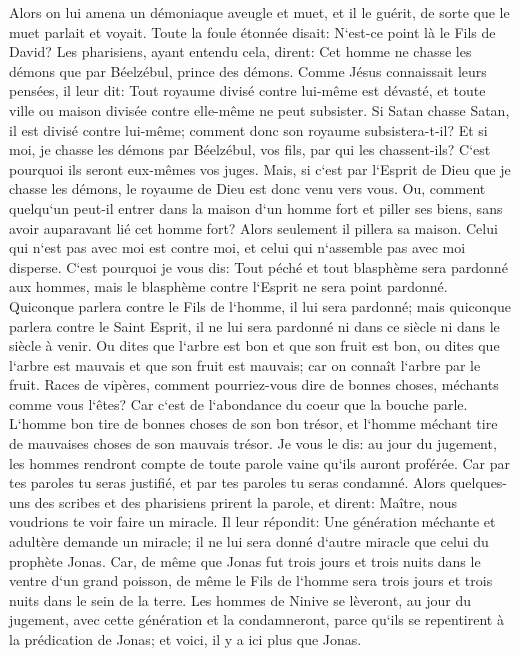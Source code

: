 \verse Alors on lui amena un démoniaque aveugle et muet, et il le guérit, de sorte que le muet parlait et voyait. 
\verse Toute la foule étonnée disait: N`est-ce point là le Fils de David? 
\verse Les pharisiens, ayant entendu cela, dirent: Cet homme ne chasse les démons que par Béelzébul, prince des démons. 
\verse Comme Jésus connaissait leurs pensées, il leur dit: Tout royaume divisé contre lui-même est dévasté, et toute ville ou maison divisée contre elle-même ne peut subsister. 
\verse Si Satan chasse Satan, il est divisé contre lui-même; comment donc son royaume subsistera-t-il? 
\verse Et si moi, je chasse les démons par Béelzébul, vos fils, par qui les chassent-ils? C`est pourquoi ils seront eux-mêmes vos juges. 
\verse Mais, si c`est par l`Esprit de Dieu que je chasse les démons, le royaume de Dieu est donc venu vers vous. 
\verse Ou, comment quelqu`un peut-il entrer dans la maison d`un homme fort et piller ses biens, sans avoir auparavant lié cet homme fort? Alors seulement il pillera sa maison. 
\verse Celui qui n`est pas avec moi est contre moi, et celui qui n`assemble pas avec moi disperse. 
\verse C`est pourquoi je vous dis: Tout péché et tout blasphème sera pardonné aux hommes, mais le blasphème contre l`Esprit ne sera point pardonné. 
\verse Quiconque parlera contre le Fils de l`homme, il lui sera pardonné; mais quiconque parlera contre le Saint Esprit, il ne lui sera pardonné ni dans ce siècle ni dans le siècle à venir. 
\verse Ou dites que l`arbre est bon et que son fruit est bon, ou dites que l`arbre est mauvais et que son fruit est mauvais; car on connaît l`arbre par le fruit. 
\verse Races de vipères, comment pourriez-vous dire de bonnes choses, méchants comme vous l`êtes? Car c`est de l`abondance du coeur que la bouche parle. 
\verse L`homme bon tire de bonnes choses de son bon trésor, et l`homme méchant tire de mauvaises choses de son mauvais trésor. 
\verse Je vous le dis: au jour du jugement, les hommes rendront compte de toute parole vaine qu`ils auront proférée. 
\verse Car par tes paroles tu seras justifié, et par tes paroles tu seras condamné. 
\verse Alors quelques-uns des scribes et des pharisiens prirent la parole, et dirent: Maître, nous voudrions te voir faire un miracle. 
\verse Il leur répondit: Une génération méchante et adultère demande un miracle; il ne lui sera donné d`autre miracle que celui du prophète Jonas. 
\verse Car, de même que Jonas fut trois jours et trois nuits dans le ventre d`un grand poisson, de même le Fils de l`homme sera trois jours et trois nuits dans le sein de la terre. 
\verse Les hommes de Ninive se lèveront, au jour du jugement, avec cette génération et la condamneront, parce qu`ils se repentirent à la prédication de Jonas; et voici, il y a ici plus que Jonas. 
